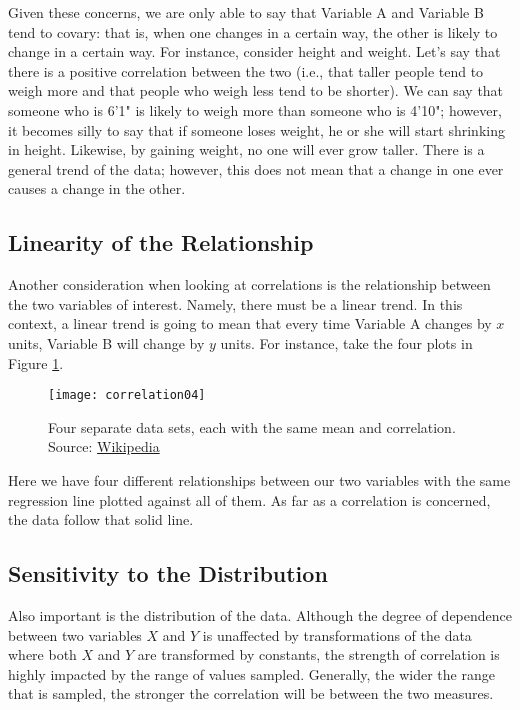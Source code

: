 Given these concerns, we are only able to say that Variable A and Variable B tend to covary: that is, when one changes in a certain way, the other is likely to change in a certain way. For instance, consider height and weight. Let's say that there is a positive correlation between the two (i.e., that taller people tend to weigh more and that people who weigh less tend to be shorter). We can say that someone who is 6'1" is likely to weigh more than someone who is 4'10"; however, it becomes silly to say that if someone loses weight, he or she will start shrinking in height. Likewise, by gaining weight, no one will ever grow taller. There is a general trend of the data; however, this does not mean that a change in one ever causes a change in the other.

\subsection{Linearity of the Relationship}
Another consideration when looking at correlations is the relationship between the two variables of interest. Namely, there must be a linear trend. In this context, a linear trend is going to mean that every time Variable A changes by \( x \) units, Variable B will change by \(y\) units. For instance, take the four plots in Figure \ref{fig:correlation04}.

\begin{figure}[h]
\texttt{[image: correlation04]}
\label{fig:correlation04}
\caption{Four separate data sets, each with the same mean and correlation. Source: \href{http://en.wikipedia.org/wiki/Correlation}{Wikipedia}}
\end{figure}

Here we have four different relationships between our two variables with the same regression line plotted against all of them. As far as a correlation is concerned, the data follow that solid line.

\subsection{Sensitivity to the Distribution}
Also important is the distribution of the data. Although the degree of dependence between two variables $X$ and $Y$ is unaffected by transformations of the data where both $X$ and $Y$ are transformed by constants, the strength of correlation is highly impacted by the range of values sampled. Generally, the wider the range that is sampled, the stronger the correlation will be between the two measures.

